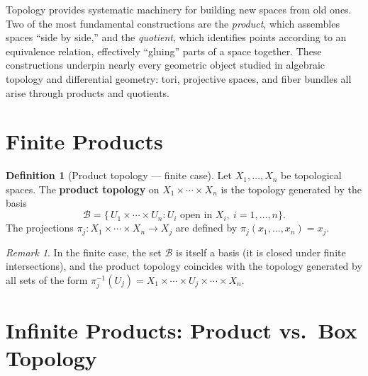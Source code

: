 \documentclass[11pt,a4paper,twoside]{book}
\theoremstyle{remark}
\newtheorem{remark}[theorem]{Remark}
\theoremstyle{definition}
\theoremstyle{definition}
\newtheorem{definition}{Definition}[section]
\begin{document}
Topology provides systematic machinery for building new spaces
from old ones.  Two of the most fundamental constructions are the
\emph{product}, which assembles spaces ``side by side,'' and the
\emph{quotient}, which identifies points according to an equivalence
relation, effectively ``gluing'' parts of a space together.  These
constructions underpin nearly every geometric object studied in
algebraic topology and differential geometry: tori, projective spaces,
and fiber bundles all arise through products and quotients.

\section{Finite Products}\label{sec:finite-products}

\begin{definition}[Product topology --- finite case]
\label{def:product-topology-finite}
Let $X_1,\dots,X_n$ be topological spaces.  The \textbf{product
topology} on $X_1\times\cdots\times X_n$ is the topology generated
by the basis
\[
   \mathcal{B} = \bigl\{\,U_1\times\cdots\times U_n :
     U_i\text{ open in }X_i,\ i=1,\dots,n\bigr\}.
\]
The projections $\pi_j\colon X_1\times\cdots\times X_n\to X_j$
are defined by $\pi_j(x_1,\dots,x_n)=x_j$.
\end{definition}

\begin{remark}\label{rem:finite-product-basis}
In the finite case, the set $\mathcal{B}$ is itself a basis (it is
closed under finite intersections), and the product topology coincides
with the topology generated by all sets of the form
$\pi_j^{-1}(U_j)=X_1\times\cdots\times U_j\times\cdots\times X_n$.
\end{remark}

\section{Infinite Products: Product vs.\ Box Topology}
\label{sec:infinite-products}
\end{document}
